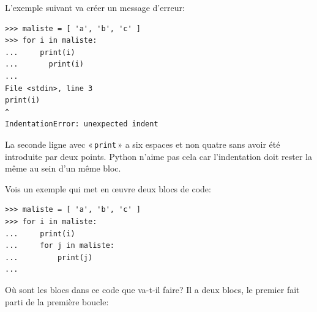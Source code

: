 L'exemple suivant va créer un message d'erreur:

\begin{Verbatim}[frame=single,rulecolor=\color{red}, label=erreur]
>>> maliste = [ 'a', 'b', 'c' ]
>>> for i in maliste:
...     print(i)
...       print(i)
...
File <stdin>, line 3
print(i)
^
IndentationError: unexpected indent
\end{Verbatim}

La seconde ligne avec « \texttt{print} » a six espaces et non quatre sans avoir été introduite par deux points. Python n'aime pas cela car l'indentation doit rester la même au sein d'un même bloc.

\begin{center}

\end{center}



Vois un exemple qui met en œuvre deux blocs de code:

\begin{Verbatim}[frame=single,rulecolor=\color{gray}, label=ne pas saisir]
>>> maliste = [ 'a', 'b', 'c' ]
>>> for i in maliste:
...     print(i)
...     for j in maliste:
...         print(j)
...
\end{Verbatim}

Où sont les blocs dans ce code que va-t-il faire?
Il a deux blocs, le premier fait parti de la première boucle:

